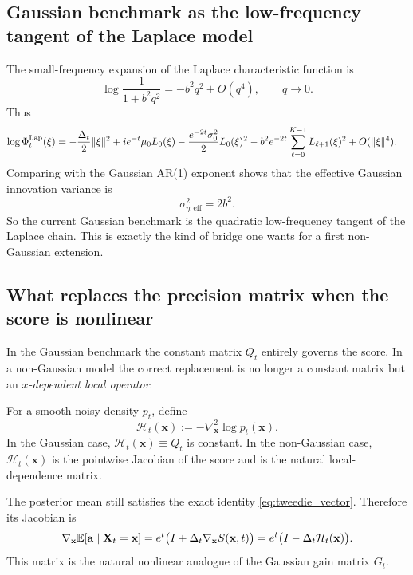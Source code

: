 \documentclass[11pt]{article}
\begin{document}
\subsection{Gaussian benchmark as the low-frequency tangent of the Laplace model}

The small-frequency expansion of the Laplace characteristic function is
\begin{equation}
 \log\frac{1}{1+b^2q^2}
 =-b^2q^2+O(q^4),
 \qquad q\to 0.
\end{equation}
Thus
\begin{align}
 \log \Phi_t^{\mathrm{Lap}}(\xi)
 &= -\frac{\Delta_t}{2}\lVert \xi\rVert^2
 +ie^{-t}\mu_0L_0(\xi)
 -\frac{e^{-2t}\sigma_0^2}{2}L_0(\xi)^2
 -b^2e^{-2t}\sum_{\ell=0}^{K-1}L_{\ell+1}(\xi)^2
 +O(\lVert \xi\rVert^4).
\end{align}
Comparing with the Gaussian AR(1) exponent shows that the effective Gaussian innovation variance is
\begin{equation}
 \sigma_{\eta,\mathrm{eff}}^2=2b^2.
\end{equation}
So the current Gaussian benchmark is the quadratic low-frequency tangent of the Laplace chain. This is exactly the kind of bridge one wants for a first non-Gaussian extension.

\subsection{What replaces the precision matrix when the score is nonlinear}

In the Gaussian benchmark the constant matrix $Q_t$ entirely governs the score. In a non-Gaussian model the correct replacement is no longer a constant matrix but an \emph{$x$-dependent local operator}.

\begin{definition}
For a smooth noisy density $p_t$, define
\begin{equation}\label{eq:observed_precision_def}
 \mathcal H_t(\mathbf x):=-\nabla_{\mathbf x}^2\log p_t(\mathbf x).
\end{equation}
In the Gaussian case, $\mathcal H_t(\mathbf x)\equiv Q_t$ is constant. In the non-Gaussian case, $\mathcal H_t(\mathbf x)$ is the pointwise Jacobian of the score and is the natural local-dependence matrix.
\end{definition}

The posterior mean still satisfies the exact identity \eqref{eq:tweedie_vector}. Therefore its Jacobian is
\begin{equation}
 \nabla_{\mathbf x}\mathbb{E}[\mathbf a\mid \mathbf X_t=\mathbf x]
 =e^t\big(I+\Delta_t\nabla_{\mathbf x}S(\mathbf x,t)\big)
 =e^t\big(I-\Delta_t\mathcal H_t(\mathbf x)\big).
\end{equation}
This matrix is the natural nonlinear analogue of the Gaussian gain matrix $G_t$.
\end{document}
